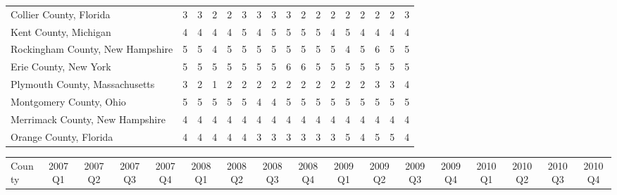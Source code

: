 \begin{landscape}
\begin{longtable}{lcccccccccccccccc}
		Collier County, Florida & 3 & 3 & 2 & 2 & 3 & 3 & 3 & 3 & 2 & 2 & 2 & 2 & 2 & 2 & 2 & 3 \\
		Kent County, Michigan & 4 & 4 & 4 & 4 & 5 & 4 & 5 & 5 & 5 & 5 & 4 & 5 & 4 & 4 & 4 & 4 \\
		Rockingham County, New Hampshire & 5 & 5 & 4 & 5 & 5 & 5 & 5 & 5 & 5 & 5 & 5 & 4 & 5 & 6 & 5 & 5 \\
		Erie County, New York & 5 & 5 & 5 & 5 & 5 & 5 & 5 & 6 & 6 & 5 & 5 & 5 & 5 & 5 & 5 & 5 \\
		Plymouth County, Massachusetts & 3 & 2 & 1 & 2 & 2 & 2 & 2 & 2 & 2 & 2 & 2 & 2 & 2 & 3 & 3 & 4 \\
		Montgomery County, Ohio & 5 & 5 & 5 & 5 & 5 & 4 & 4 & 5 & 5 & 5 & 5 & 5 & 5 & 5 & 5 & 5 \\
		Merrimack County, New Hampshire & 4 & 4 & 4 & 4 & 4 & 4 & 4 & 4 & 4 & 4 & 4 & 4 & 4 & 4 & 4 & 4 \\
		Orange County, Florida & 4 & 4 & 4 & 4 & 4 & 3 & 3 & 3 & 3 & 3 & 3 & 5 & 4 & 5 & 5 & 4

\end{longtable}



\newpage


\begin{longtable}{lcccccccccccccccc}
	\setlength{\tabcolsep}{8pt}
	County &2007Q1 &2007Q2 &2007Q3 &2007Q4 &2008Q1 &2008Q2 &2008Q3 &2008Q4 &2009Q1 & 2009Q2 &2009Q3 &2009Q4 &2010Q1 &2010Q2 &2010Q3 & 2010Q4 \\


\end{longtable}
\end{landscape}
